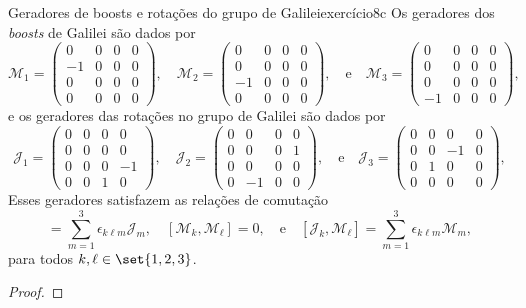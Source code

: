 \begin{proposition}{Geradores de boosts e rotações do grupo de Galilei}{exercício8c}
    Os geradores dos \emph{boosts} de Galilei são dados por
    \begin{equation*}
        \mathcal{M}_1 = \begin{pmatrix}
            0 & 0 & 0 & 0\\
            -1 & 0 & 0 & 0\\
            0 & 0 & 0 & 0\\
            0 & 0 & 0 & 0
        \end{pmatrix},\quad
        \mathcal{M}_2 = \begin{pmatrix}
            0 & 0 & 0 & 0\\
            0 & 0 & 0 & 0\\
            -1 & 0 & 0 & 0\\
            0 & 0 & 0 & 0
        \end{pmatrix},\quad\text{e}\quad
        \mathcal{M}_3 = \begin{pmatrix}
            0 & 0 & 0 & 0\\
            0 & 0 & 0 & 0\\
            0 & 0 & 0 & 0\\
            -1 & 0 & 0 & 0
        \end{pmatrix},
    \end{equation*}
    e os geradores das rotações no grupo de Galilei são dados por
    \begin{equation*}
        \mathcal{J}_1 = \begin{pmatrix}
            0 & 0 & 0 & 0\\
            0 & 0 & 0 & 0\\
            0 & 0 & 0 & -1\\
            0 & 0 & 1 & 0
        \end{pmatrix},\quad
        \mathcal{J}_2 = \begin{pmatrix}
            0 & 0 & 0 & 0\\
            0 & 0 & 0 & 1\\
            0 & 0 & 0 & 0\\
            0 & -1 & 0 & 0
        \end{pmatrix},\quad\text{e}\quad
        \mathcal{J}_3 = \begin{pmatrix}
            0 & 0 & 0 & 0\\
            0 & 0 & -1 & 0\\
            0 & 1 & 0 & 0\\
            0 & 0 & 0 & 0
        \end{pmatrix},
    \end{equation*}
    Esses geradores satisfazem as relações de comutação
    \begin{equation*}
        [\mathcal{J}_k, \mathcal{J}_\ell] = \sum_{m=1}^3 \epsilon_{k \ell m}\mathcal{J}_m,\quad
        [\mathcal{M}_k, \mathcal{M}_\ell] = 0,\quad\text{e}\quad
        [\mathcal{J}_k, \mathcal{M}_\ell] = \sum_{m=1}^3 \epsilon_{k \ell m}\mathcal{M}_m,
    \end{equation*}
    para todos \(k, \ell \in \set{1,2,3}\).
\end{proposition}
\begin{proof}

\end{proof}
